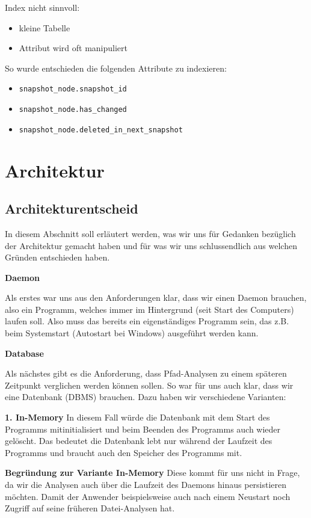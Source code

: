 \documentclass[a4paper,12pt]{report}
\begin{document}
    Index nicht sinnvoll:
    \begin{itemize}
        \item kleine Tabelle
        \item Attribut wird oft manipuliert
    \end{itemize}

    So wurde entschieden die folgenden Attribute zu indexieren:
    \begin{itemize}
        \item \verb|snapshot_node.snapshot_id|
        \item \verb|snapshot_node.has_changed|
        \item \verb|snapshot_node.deleted_in_next_snapshot|
    \end{itemize}


    \section{Architektur}

    \subsection{Architekturentscheid}
    In diesem Abschnitt soll erläutert werden, was wir uns für Gedanken bezüglich der Architektur gemacht haben
    und für was wir uns schlussendlich aus welchen Gründen entschieden haben.

        {\large\bfseries Daemon}

    Als erstes war uns aus den Anforderungen klar, dass wir einen Daemon brauchen, also ein Programm, welches immer im
    Hintergrund (seit Start des Computers) laufen soll.
    Also muss das bereits ein eigenständiges Programm sein, das z.B. beim Systemstart (Autostart bei Windows) ausgeführt werden kann.

        {\large\bfseries Database}

    Als nächstes gibt es die Anforderung, dass Pfad-Analysen zu einem späteren Zeitpunkt verglichen werden können sollen.
    So war für uns auch klar, dass wir eine Datenbank (DBMS) brauchen.
    Dazu haben wir verschiedene Varianten:

    \textbf{1. In-Memory}
    In diesem Fall würde die Datenbank mit dem Start des Programms mitinitialisiert und beim Beenden des Programms auch wieder gelöscht.
    Das bedeutet die Datenbank lebt nur während der Laufzeit des Programms und braucht auch den Speicher des Programms mit.

    \textbf{Begründung zur Variante In-Memory} Diese kommt für uns nicht in Frage, da wir die Analysen auch über die Laufzeit des Daemons hinaus persistieren möchten.
    Damit der Anwender beispielsweise auch nach einem Neustart noch Zugriff auf seine früheren Datei-Analysen hat.
\end{document}
